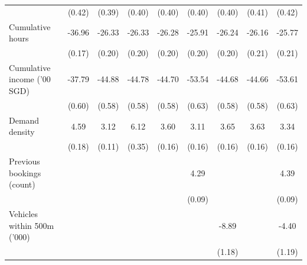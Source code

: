 \documentclass[reviewmode]{restat}
\begin{document}
\begin{appendices}
\begin{table}
{\begin{minipage}{20cm}
{\begin{tabular}{l*{8}{c}}
                                &     (0.42)         &     (0.39)         &     (0.40)         &     (0.40)         &     (0.40)         &     (0.40)         &     (0.41)         &     (0.42)         \\
            \addlinespace
            Cumulative hours    &     -36.96\sym{***}&     -26.33\sym{***}&     -26.33\sym{***}&     -26.28\sym{***}&     -25.91\sym{***}&     -26.24\sym{***}&     -26.16\sym{***}&     -25.77\sym{***}\\
                                &     (0.17)         &     (0.20)         &     (0.20)         &     (0.20)         &     (0.20)         &     (0.20)         &     (0.21)         &     (0.21)         \\
            \addlinespace
            Cumulative income ('00 SGD)&     -37.79\sym{***}&     -44.88\sym{***}&     -44.78\sym{***}&     -44.70\sym{***}&     -53.54\sym{***}&     -44.68\sym{***}&     -44.66\sym{***}&     -53.61\sym{***}\\
                                &     (0.60)         &     (0.58)         &     (0.58)         &     (0.58)         &     (0.63)         &     (0.58)         &     (0.58)         &     (0.63)         \\
            \addlinespace
            Demand density      &       4.59\sym{***}&       3.12\sym{***}&       6.12\sym{***}&       3.60\sym{***}&       3.11\sym{***}&       3.65\sym{***}&       3.63\sym{***}&       3.34\sym{***}\\
                                &     (0.18)         &     (0.11)         &     (0.35)         &     (0.16)         &     (0.16)         &     (0.16)         &     (0.16)         &     (0.16)         \\
            \addlinespace
            Previous bookings (count)&                     &                     &                     &                     &       4.29\sym{***}&                     &                     &       4.39\sym{***}\\
                                &                     &                     &                     &                     &     (0.09)         &                     &                     &     (0.09)         \\
            \addlinespace
            Vehicles within 500m ('000)&                     &                     &                     &                     &                     &      -8.89\sym{***}&                     &      -4.40\sym{***}\\
                                &                     &                     &                     &                     &                     &     (1.18)         &                     &     (1.19)         \\

\end{tabular}}
\end{minipage}}
\end{table}
\end{appendices}
\end{document}
